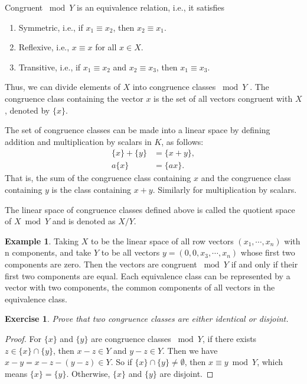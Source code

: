 \documentclass[11pt]{book}
\newtheorem{exercise}{Exercise}[section]
\theoremstyle{definition}
\newtheorem{example}{Example}[chapter]
\numberwithin{equation}{chapter}
\begin{document}
Congruent $\bmod Y$ is an equivalence relation, i.e., it satisfies
\begin{enumerate}[label=(\arabic*)]
    \item Symmetric, i.e., if $x_1\equiv x_2$, then $x_2\equiv x_1$.
    \item Reflexive, i.e., $x\equiv x$ for all $x\in X$.
    \item Transitive, i.e., if $x_1\equiv x_2$ and $x_2\equiv x_3$, then $x_1\equiv x_3$.
\end{enumerate}
Thus, we can divide elements of $X$ into congruence classes $\bmod Y$ . The congruence class containing the vector $x$ is the set of all vectors congruent with $X$, denoted by $\{x\}$.

The set of congruence classes can be made into a linear space by defining addition and multiplication by scalars in $K$, as follows:
\begin{align*}
    \{x\} + \{y\}& = \{x+y\},\\
    a\{x\} &= \{ax\}.
\end{align*}
That is, the sum of the congruence class containing $x$ and the congruence class containing $y$ is the class containing $x + y$. Similarly for multiplication by scalars.

The linear space of congruence classes defined above is called the quotient space of $X \bmod Y$ and is denoted as $X/Y$. 

\medskip

\begin{example}
Taking $X$ to be the linear space of all row vectors $(x_1,\cdots, x_n)$ with n components, and take $Y$ to be all vectors $y = (0, 0, x_3,\cdots, x_n) $ whose first two components are zero. Then the vectors are congruent $\bmod Y$ if and only if their first two components are equal. Each equivalence class can be represented by a vector with two components, the common components of all vectors in the equivalence class. 
\end{example}

\medskip

\begin{exercise}
Prove that two congruence classes are either identical or disjoint. 
\end{exercise}
\begin{proof}
For $\{x\}$ and $\{y\}$ are congruence classes $\bmod Y$, if there exists $z\in \{x\}\cap \{y\}$, then $x-z \in Y$ and $y-z\in Y$. Then we have $x-y = x-z-(y-z) \in Y$. So if $\{x\}\cap \{y\}\neq \emptyset$, then $x\equiv y \bmod Y$, which means $\{x\} = \{y\}$. Otherwise, $\{x\}$ and $\{y\}$ are disjoint.
\end{proof}
\end{document}
